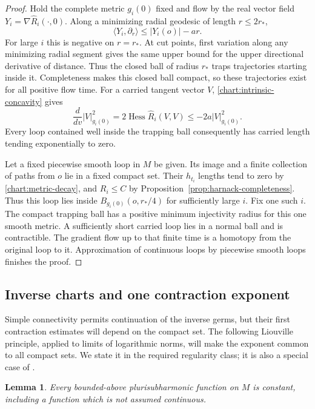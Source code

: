 \documentclass[11pt]{article}
\newtheorem{lemma}[theorem]{Lemma}
\theoremstyle{definition}
\theoremstyle{remark}
\numberwithin{equation}{section}
\begin{document}
\begin{proof}
Hold the complete metric $g_i(0)$ fixed and flow by the real
vector field $Y_i=\nabla\widehat R_i(\cdot,0)$.  Along a
minimizing radial geodesic of length $r\le2r_*$,
\[
 \langle Y_i,\partial_r\rangle
 \le |Y_i(o)|-ar.
\]
For large $i$ this is negative on $r=r_*$.  At cut points,
first variation along any minimizing radial segment gives the
same upper bound for the upper directional derivative of
distance.  Thus the closed ball of radius $r_*$ traps trajectories
starting inside it.  Completeness makes this closed ball compact,
so these trajectories exist for all positive flow time.
For a carried tangent vector $V$, \eqref{chart:intrinsic-concavity}
gives
\[
 \frac{d}{dv}|V|_{g_i(0)}^2
 =2\operatorname{Hess}\widehat R_i(V,V)
 \le-2a|V|_{g_i(0)}^2.
\]
Every loop contained well inside the trapping ball consequently
has carried length tending exponentially to zero.

Let a fixed piecewise smooth loop in $M$ be given.  Its image
and a finite collection of paths from $o$ lie in a fixed compact
set.  Their $h_{t_i}$ lengths tend to zero by
\eqref{chart:metric-decay}, and $R_i\le C$ by
Proposition~\ref{prop:harnack-completeness}.  Thus this loop
lies inside $B_{g_i(0)}(o,r_*/4)$ for sufficiently large $i$.
Fix one such $i$.  The compact trapping ball has a positive
minimum injectivity radius for this one smooth metric.  A
sufficiently short carried loop lies in a normal ball and is
contractible.  The gradient flow up to that finite time is a
homotopy from the original loop to it.  Approximation of
continuous loops by piecewise smooth loops finishes the proof.
\end{proof}

\subsection{Inverse charts and one contraction exponent}

Simple connectivity permits continuation of the inverse germs, but
their first contraction estimates will depend on the compact set.
The following Liouville principle, applied to limits of logarithmic
norms, will make the exponent common to all compact sets.  We state it
in the required regularity class; it is also a special case of
\cite[Theorem~9]{LiuThreeCircle}.

\begin{lemma}\label{chart:psh-liouville}
Every bounded-above plurisubharmonic function on $M$ is constant,
including a function which is not assumed continuous.
\end{lemma}
\end{document}
